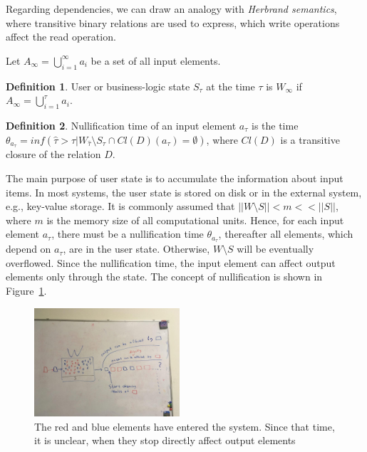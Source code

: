 \documentclass[sigconf]{acmart}
\theoremstyle{definition}
\newtheorem{definition}{Definition}
\begin{document}
Regarding dependencies, we can draw an analogy with {\em Herbrand semantics}, where transitive binary relations are used to express, which write operations affect the read operation.

Let $A_{\infty}=\bigcup\limits_{i=1}^{\infty}{a_i}$ be a set of all input elements.

\begin{definition}{User or business-logic state}
$S_\tau$ at the time $\tau$ is $W_{\infty}$ if $A_{\infty}=\bigcup\limits_{i=1}^{\tau}{a_i}$.
\end{definition}

\begin{definition}{Nullification time}
of an input element $a_\tau$ is the time $\theta_{a_\tau}=inf(\hat{\tau}>\tau|W_{\hat{\tau}}\setminus{S_{\hat{\tau}}}\cap{Cl(D)(a_\tau)=\emptyset})$, where $Cl(D)$ is a transitive closure of the relation $D$.
\end{definition}

The main purpose of user state is to accumulate the information about input items. In most systems, the user state is stored on disk or in the external system, e.g., key-value storage. It is commonly assumed that $||{W}\setminus{S}||<m<<||S||$, where $m$ is the memory size of all computational units. Hence, for each input element $a_\tau$, there must be a nullification time $\theta_{a_\tau}$, thereafter all elements, which depend on $a_\tau$, are in the user state. Otherwise, $W\setminus{S}$ will be eventually overflowed. Since the nullification time, the input element can affect output elements only through the state. The concept of nullification is shown in Figure~\ref{nullification}.   

\begin{figure}[htbp]
  \centering
  \includegraphics[width=0.48\textwidth]{pics/nullification}
  \caption{The red and blue elements have entered the system. Since that time, it is unclear, when they stop directly affect output elements}
  \label {nullification}
\end{figure}
\end{document}

